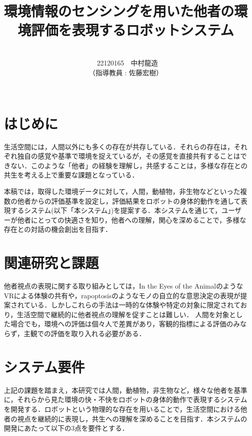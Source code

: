 \documentclass[paper=a4paper,jafontsize=9pt,head_space=15mm,gutter=20mm,
twocolumn,number_of_lines=49, line_length=26zw]{myuarticle}
\begin{document}
\title{{\Large\bfseries\gtfamily 環境情報のセンシングを用いた他者の環境評価を表現するロボットシステム}}
\author{\\\ 22120165　中村龍造 \\ （指導教員 : 佐藤宏樹）\\ \\}
\date{}
\maketitle

\section{はじめに}
生活空間には，人間以外にも多くの存在が共存している．それらの存在は，それぞれ独自の感覚や基準で環境を捉えているが，その感覚を直接共有することはできない．このような「他者」の経験を理解し，共感することは，多様な存在との共生を考える上で重要な課題となっている．

本稿では，取得した環境データに対して，人間，動植物，非生物などといった複数の他者からの評価基準を設定し，評価結果をロボットの身体的動作を通して表現するシステム(以下「本システム」)を提案する．本システムを通じて，ユーザーが他者にとっての快適さを知り，他者への理解，関心を深めることで，多様な存在との対話の機会創出を目指す．

\section{関連研究と課題}

他者視点の表現に関する取り組みとしては，In the Eyes of the Animal\cite{Dezeen-2015-MarshmallowLaserFeastsEyes}のようなVRによる体験の共有や，rapoptosis\cite{--ソンヨン}のようなモノの自立的な意思決定の表現が提案されている．しかしこれらの手法は一時的な体験や特定の対象に限定されており，生活空間で継続的に他者視点の理解を促すことは難しい．
人間を対象とした場合でも，環境への評価は個々人で差異があり，客観的指標による評価のみならず，主観での評価を取り入れる必要がある\cite{Coulby-2020-ScopingReviewTechnologicalApproaches}．

\section{システム要件}

上記の課題を踏まえ，本研究では人間，動植物，非生物など，様々な他者を基準に，それらから見た環境の快・不快をロボットの身体的動作で表現するシステムを開発する．ロボットという物理的な存在を用いることで，生活空間における他者の視点を継続的に表現し，共生への理解を深めることを目指す．本システムの開発にあたって以下の3点を要件とする．
\end{document}
